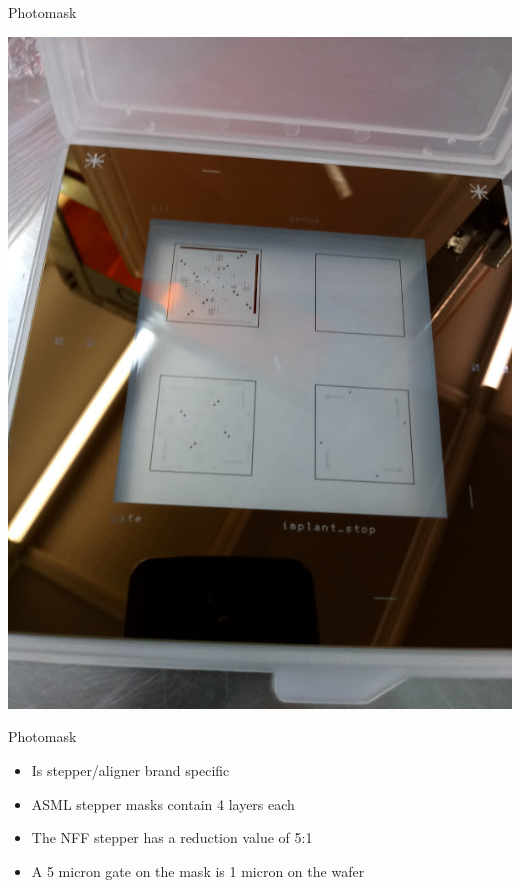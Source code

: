 \documentclass[aspectratio=169]{beamer}
\begin{document}
\begin{frame}{Photomask}
\begin{center}
\includegraphics[height=0.8\textheight]{images/20181207_113845_Burst01.jpg}
\end{center}
\end{frame}

\begin{frame}{Photomask}
	\begin{itemize}
		\item Is stepper/aligner brand specific
		\item ASML stepper masks contain 4 layers each
		\item The NFF stepper has a reduction value of 5:1
		\item A 5 micron gate on the mask is 1 micron on the wafer
	\end{itemize}
\end{frame}
\end{document}
